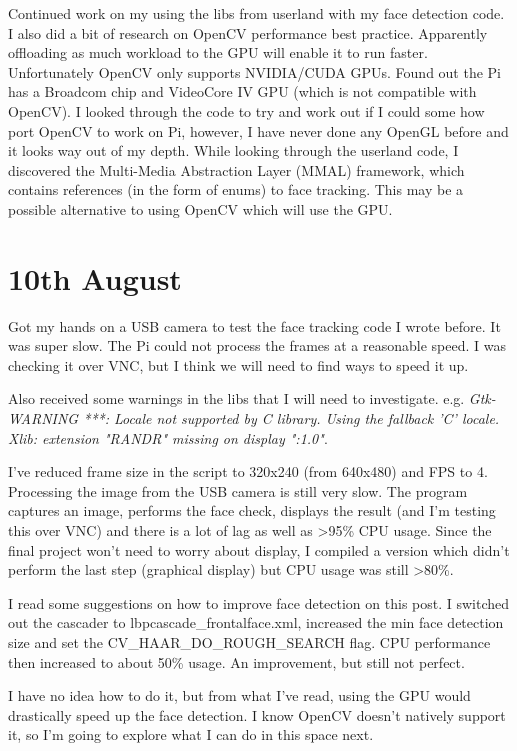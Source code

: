 Continued work on my using the libs from userland with my face detection code. I also did a bit of research on OpenCV performance best practice. Apparently offloading as much workload to the GPU will enable it to run faster. Unfortunately OpenCV only supports NVIDIA/CUDA GPUs. Found out the Pi has a Broadcom chip and VideoCore IV GPU (which is not compatible with OpenCV). I looked through the code to try and work out if I could some how port OpenCV to work on Pi, however, I have never done any OpenGL before and it looks way out of my depth. While looking through the userland code, I discovered the Multi-Media Abstraction Layer (MMAL) framework, which contains references (in the form of enums) to face tracking. This may be a possible alternative to using OpenCV which will use the GPU.


\section*{10th August}

Got my hands on a USB camera to test the face tracking code I wrote before. It was super slow. The Pi could not process the frames at a reasonable speed. I was checking it over VNC, but I think we will need to find ways to speed it up.

Also received some warnings in the libs that I will need to investigate. e.g. \textit{Gtk-WARNING ***: Locale not supported by C library. Using the fallback 'C' locale. Xlib: extension "RANDR" missing on display ":1.0"}.


I've reduced frame size in the script to 320x240 (from 640x480) and FPS to 4. Processing the image from the USB camera is still very slow. The program captures an image, performs the face check, displays the result (and I'm testing this over VNC) and there is a lot of lag as well as >95\% CPU usage. Since the final project won't need to worry about display, I compiled a version which didn't perform the last step (graphical display) but CPU usage was still >80\%.

I read some suggestions on how to improve face detection on this post. I switched out the cascader to lbpcascade\_frontalface.xml, increased the min face detection size and set the CV\_HAAR\_DO\_ROUGH\_SEARCH flag. CPU performance then increased to about 50\% usage. An improvement, but still not perfect.

I have no idea how to do it, but from what I've read, using the GPU would drastically speed up the face detection. I know OpenCV doesn't natively support it, so I'm going to explore what I can do in this space next.



